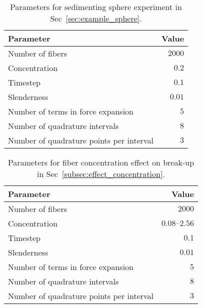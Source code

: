 \begin{table}[!htbp]
  \caption*{Parameters for sedimenting sphere experiment in Sec~\ref{sec:example_sphere}.}
  \begin{center}
    \begin{tabulary}{\textwidth}{LR}
      \toprule
      Parameter & Value \\
      \midrule
      Number of fibers & $2000$ \\
      Concentration & $0.2$ \\
      Timestep & $0.1$ \\
      Slenderness & $0.01$ \\
      Number of terms in force expansion & $5$ \\
      Number of quadrature intervals & $8$ \\
      Number of quadrature points per interval & $3$ \\
      \bottomrule
    \end{tabulary}
  \end{center}
\end{table}

\begin{table}[!htbp]
  \caption*{Parameters for fiber concentration effect on break-up in Sec~\ref{subsec:effect_concentration}.}
  \begin{center}
    \begin{tabulary}{\textwidth}{LR}
      \toprule
      Parameter & Value \\
      \midrule
      Number of fibers & $2000$ \\
      Concentration & $0.08–2.56$ \\
      Timestep & $0.1$ \\
      Slenderness & $0.01$ \\
      Number of terms in force expansion & $5$ \\
      Number of quadrature intervals & $8$ \\
      Number of quadrature points per interval & $3$ \\
      \bottomrule
    \end{tabulary}
  \end{center}
\end{table}

